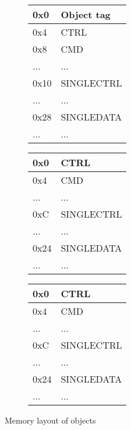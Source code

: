 \begin{figure}[H]

  \centering
  \begin{subfigure}{0.31\textwidth}
    \begin{tabular}{|l|l|}
      \hline
      0x0&Object tag \\ \hline
      0x4&CTRL       \\ \hline
      0x8&CMD        \\ \hline
      ...&...        \\ \hline
      0x10&SINGLECTRL\\ \hline
      ...&...        \\ \hline
      0x28&SINGLEDATA\\ \hline
      ...&...        \\ \hline
    \end{tabular}
    \caption{{\Java}}
    \label{fig:back:memlayout:java}
  \end{subfigure}
  \hfill
  \begin{subfigure}{0.31\textwidth}
    \begin{tabular}{|l|l|}
      \hline
      0x0&CTRL       \\ \hline
      0x4&CMD        \\ \hline
      ...&...        \\ \hline
      0xC&SINGLECTRL \\ \hline
      ...&...        \\ \hline
      0x24&SINGLEDATA\\ \hline
      ...&...        \\ \hline
    \end{tabular}
    \caption{{\C}}
    \label{fig:back:memlayout:c}
  \end{subfigure}
  \hfill
  \begin{subfigure}{0.31\textwidth}
    \begin{tabular}{|l|l|}
      \hline
      0x0&CTRL       \\ \hline
      0x4&CMD        \\ \hline
      ...&...        \\ \hline
      0xC&SINGLECTRL \\ \hline
      ...&...        \\ \hline
      0x24&SINGLEDATA\\ \hline
      ...&...        \\ \hline
    \end{tabular}
    \caption{{\rust}}
    \label{fig:back:memlayout:rust}
  \end{subfigure}
  \caption{Memory layout of objects}
  \label{fig:back:memlayout}

\end{figure}

